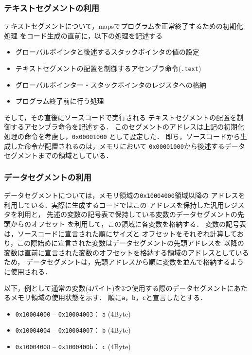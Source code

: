 \subsubsection{テキストセグメントの利用}
テキストセグメントについて，mapsでプログラムを正常終了するための初期化処理
をコード生成の直前に，以下の処理を記述する
\begin{itemize}
  \item グローバルポインタと後述するスタックポインタの値の設定
  \item テキストセグメントの配置を制御するアセンブラ命令(\verb|.text|)
  \item グローバルポインター・スタックポインタのレジスタへの格納
  \item プログラム終了前に行う処理
\end{itemize}
そして，その直後にソースコードで実行される
テキストセグメントの配置を制御するアセンブラ命令を記述する．
このセグメントのアドレスは上記の初期化処理の命令を考慮し，\verb|0x00001000|
として設定した．
即ち，ソースコードから生成した命令が配置されるのは，メモリにおいて
\verb|0x00001000|から後述するデータセグメントまでの領域としている．

\subsubsection{データセグメントの利用}
データセグメントについては，メモリ領域の\verb|0x10004000|領域以降の
アドレスを利用している．実際に生成するコードではこの
アドレスを保持した汎用レジスタを利用と，
先述の変数の記号表で保持している変数のデータセグメントの先頭からのオフセット
を利用して，この領域に各変数を格納する．
変数の記号表は，ソースコードに宣言された順にサイズと
オフセットをそれぞれ計算しており，この際始めに宣言された変数はデータセグメントの先頭アドレスを
以降の変数は直前に宣言された変数のオフセットを格納する領域のアドレスとしているため，
データセグメントは，先頭アドレスから順に変数を並んで格納するように使用される．

以下，例として通常の変数(4バイト)を3つ使用する際のデータセグメントにあたるメモリ領域の使用状態を示す．
順に\verb|a|，\verb|b|，\verb|c|と宣言したとする．

\begin{itemize}
  \item\texttt{0x10004000} -- \texttt{0x10004003}： \verb|a| (4Byte) 
  \item\texttt{0x10004004} -- \texttt{0x10004007}： \verb|b| (4Byte) 
  \item\texttt{0x10004008} -- \texttt{0x1000400b}： \verb|c| (4Byte) 
\end{itemize}

